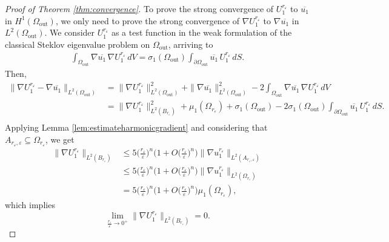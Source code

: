 \documentclass[12pt,reqno]{amsart}
\numberwithin{equation}{section}
\numberwithin{theorem}{section}
\numberwithin{equation}{section}
\numberwithin{theorem}{section}
\begin{document}
\begin{proof}[Proof of Theorem \ref{thm:convergence}]
To prove the strong convergence of $ U_1^{r_\varepsilon}$ to $\overline{u_1}$ in $H^1( \Omega_{\mathrm{out}})$, we only need to prove the strong convergence of  $ \nabla U_1^{r_\varepsilon}$ to $\nabla \overline{u_1}$ in $L^2(\Omega_{\mathrm{out}}).$ We consider $U_1^{r_\varepsilon}$ as a test function  in the weak formulation of the classical Steklov eigenvalue problem on $\Omega_\mathrm{out}$, arriving to 
\begin{align}
      \int_{ \Omega_{\mathrm{out}}} \nabla \overline{u_1} \, \nabla U_1^{r_\varepsilon} \,dV =\sigma_1(\Omega_{\mathrm{out}}) \int_{\partial \Omega_{\mathrm{out}}} \overline{u_1}\, U_1^{r_\varepsilon} \, dS.
\end{align}
Then,
\begin{align*}
    \|\nabla U_1^{r_\varepsilon}-\nabla \overline{u_1}\|_{L^2(\Omega_{\mathrm{out}})}
    &=\|\nabla U_1^{r_\varepsilon}\|^2_{L^2( \Omega_{\mathrm{out}})} + \|\nabla \overline{u_1}\|^2_{L^2( \Omega_{\mathrm{out}})} -2 \int_{ \Omega_{\mathrm{out}}} \nabla \overline{u_1} \, \nabla U_1^{r_\varepsilon} \, dV\\
    &= \|\nabla U_1^{r_\varepsilon}\|^2_{L^2( B_{r_\varepsilon})} +\mu_1( \Omega_{r_\varepsilon}) + \sigma_1( \Omega_{\mathrm{out}}) -2 \sigma_1(\Omega_{\mathrm{out}})\int_{ \partial \Omega_{\mathrm{out}}}  \overline{u_1} \,  U_1^{r_\varepsilon} \, dS.\\
\end{align*}
Applying Lemma \ref{lem:estimateharmonicgradient} and considering that $A_{r_\varepsilon,\varepsilon}\subseteq \Omega_{r_\varepsilon}$, we get 
\begin{equation*}
\begin{split}
    \| \nabla U_1^{r_\varepsilon}\|_{L^2(B_{r_\varepsilon})}&\le 5\bigg(\frac{r_\varepsilon}{\varepsilon}\bigg)^n\bigg(1+O\bigg(\frac{r_\varepsilon}{\varepsilon}\bigg)^n\bigg)\|\nabla u_1^{r_\varepsilon}\|_{L^2(A_{r_\varepsilon,\varepsilon})}  \\
    & \le 5\bigg(\frac{r_\varepsilon}{\varepsilon}\bigg)^n\bigg(1+O\bigg(\frac{r_\varepsilon}{\varepsilon}\bigg)^n\bigg)\|\nabla u_1^{r_\varepsilon}\|_{L^2(\Omega_{r_\varepsilon})} \\
     &=5\bigg(\frac{r_\varepsilon}{\varepsilon}\bigg)^n\bigg(1+O\bigg(\frac{r_\varepsilon}{\varepsilon}\bigg)^n\bigg)\mu_1(\Omega_{r_\varepsilon}),
\end{split}
\end{equation*}
which implies
\begin{equation*}
    \lim_{\frac{r_\varepsilon}{\varepsilon}\to 0^+}\| \nabla U_1^{r_\varepsilon}\|_{L^2(B_{r_\varepsilon})}= 0.

\end{equation*}
\end{proof}
\end{document}
